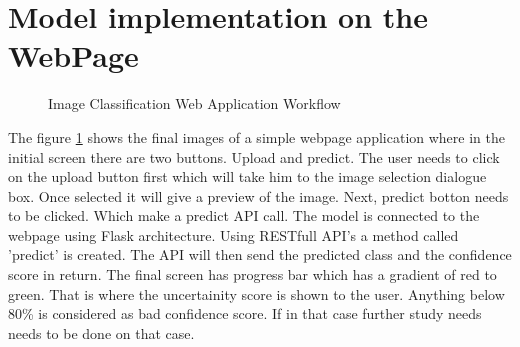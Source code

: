 \documentclass[12pt,onecolumn]{report}
\begin{document}
\section{Model implementation on the WebPage}
\begin{figure}[H]
    \centering
    \label{fig:webapp_subfig_a}
    \hfill
    \label{fig:webapp_subfig_b}
    \caption{Image Classification Web Application Workflow}
    \label{fig:webapp_workflow}
\end{figure}
The figure \ref{fig:webapp_workflow} shows the final images of a simple webpage application where in the initial screen there are two buttons. Upload and predict. The user needs to click on the upload button first which will take him to the image selection dialogue box. Once selected it will give a preview of the image. Next, predict botton needs to be clicked. Which make a predict API call. The model is  connected to the webpage using Flask architecture. Using RESTfull API's a method called 'predict' is created. The API will then send the predicted class and the confidence score in return. The final screen has progress bar which has a gradient of red to green. That is where the uncertainity score is shown to the user. Anything below 80\% is considered as bad confidence score. If in that case further study needs needs to be done on that case. 
\end{document}
